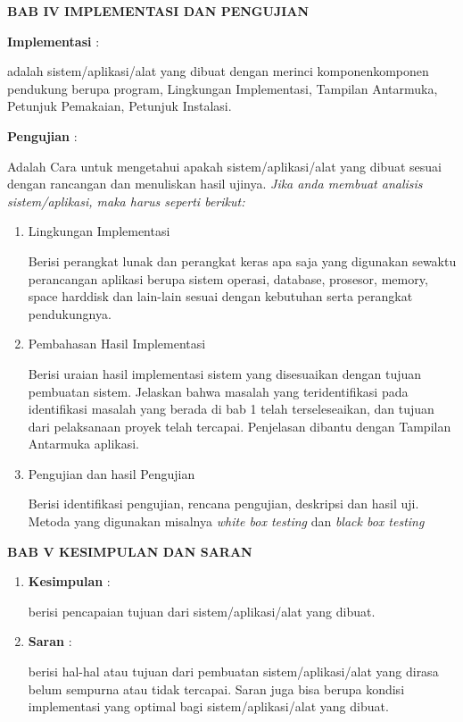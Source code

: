 \begin{enumerate}
	\par \textbf{BAB IV IMPLEMENTASI DAN PENGUJIAN} \par 
	\textbf{Implementasi} : \par 
	adalah	sistem/aplikasi/alat	yang	dibuat	dengan	merinci	komponenkomponen	 pendukung	 berupa	 program,	 Lingkungan	 Implementasi, Tampilan	Antarmuka,	Petunjuk	Pemakaian,	Petunjuk	Instalasi.
	
	\textbf{Pengujian} : \par 
	Adalah	 Cara	 untuk	 mengetahui	 apakah	 sistem/aplikasi/alat	 yang dibuat	sesuai	dengan	rancangan	dan	menuliskan	hasil	ujinya.
\textit{Jika	 anda	 membuat	 analisis	 sistem/aplikasi,	 maka	 harus	 seperti berikut:}
	
	\begin{enumerate} [label=4.\arabic*]
		\item Lingkungan	Implementasi \par 	
		Berisi	 perangkat	 lunak	 dan	 perangkat	 keras	 apa	 saja yang	digunakan	 sewaktu	 perancangan	 aplikasi	 berupa	 sistem	operasi,	database,	prosesor,	memory,	space	harddisk	dan	lain-lain	sesuai	dengan	kebutuhan serta	perangkat	pendukungnya.
		
		\item Pembahasan	Hasil	Implementasi \par 
		Berisi	 uraian	 hasil	 implementasi	 sistem	 yang	 disesuaikan	dengan	 tujuan	 pembuatan	 sistem.	 Jelaskan bahwa	 masalah	 yang	teridentifikasi	 pada	 identifikasi	 masalah yang berada	 di	 bab	 1	 telah	terseleseaikan, dan	 tujuan	 dari	 pelaksanaan	 proyek	telah tercapai. Penjelasan	dibantu	dengan	Tampilan	Antarmuka	aplikasi.
		
		\item Pengujian	dan	hasil	Pengujian \par 
		Berisi	identifikasi	 pengujian,	 rencana	 pengujian,	 deskripsi dan hasil	uji.	Metoda	yang	digunakan	misalnya \textit{white	box testing} dan \textit{	black	box	testing}
		
	\end{enumerate}	 
	
	
	
	\par \textbf{BAB V KESIMPULAN	DAN	SARAN} \par 
	
	\begin{enumerate} [label=5.\arabic*]
		\item \textbf{Kesimpulan} : \par 
				berisi	pencapaian	tujuan	dari	sistem/aplikasi/alat	                yang	dibuat.
		\item \textbf{Saran} : \par 
				berisi	hal-hal	atau	tujuan	dari	pembuatan	sistem/aplikasi/alat	yang dirasa	belum	sempurna	atau	 tidak	 tercapai.	Saran	juga	bisa	berupa	kondisi	 implementasi	 yang	 optimal	 bagi	 sistem/aplikasi/alat	 yang dibuat.
	\end{enumerate}
			

\end{enumerate}
